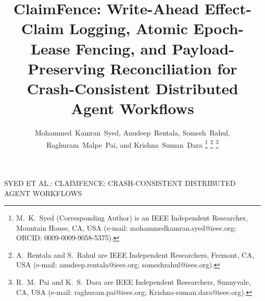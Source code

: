 \documentclass[10pt,journal]{IEEEtran}
\def\CF{ClaimFence}%
\theoremstyle{definition}
\theoremstyle{remark}
\newcommand{\CF}{\textsc{ClaimFence}}
\begin{document}
\title{\CF{}: Write-Ahead Effect-Claim Logging, Atomic Epoch-Lease Fencing, and Payload-Preserving Reconciliation for Crash-Consistent Distributed Agent Workflows}

\author{Mohammed~Kamran~Syed,
Anudeep~Rentala,
Somesh~Rahul,
Raghuram~Malpe~Pai, and
Krishna~Suman~Dara%
\thanks{M.~K.~Syed (Corresponding Author) is an IEEE Independent Researcher, Mountain House, CA, USA (e-mail: mohammedkamran.syed@ieee.org; ORCID: 0009-0009-9058-5375).}%
\thanks{A.~Rentala and S.~Rahul are IEEE Independent Researchers, Fremont, CA, USA (e-mail: anudeep.rentala@ieee.org; someshrahul@ieee.org).}%
\thanks{R.~M.~Pai and K.~S.~Dara are IEEE Independent Researchers, Sunnyvale, CA, USA (e-mail: raghuram.pai@ieee.org; Krishna-suman.dara@ieee.org).}}

%
{SYED ET AL.: CLAIMFENCE: CRASH-CONSISTENT DISTRIBUTED AGENT WORKFLOWS}

\maketitle
\end{document}
